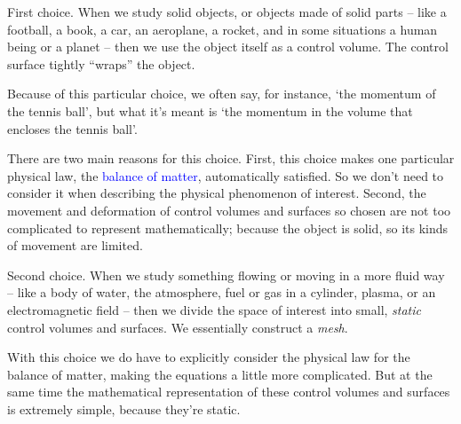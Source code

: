 \documentclass[a4paper,12pt,%
onecolumn,oneside,%
british%
]{memoir}
\renewcommand*{\|}[1][]{\nonscript\:#1\vert\nonscript\:\mathopen{}}
\newcommand*{\sect}{\S}%
\renewcommand*{\autoref}[2]{\sidepar{\vspace{-1ex}\footnotesize{\color{blue}\faIcon{%
angle-right%
}\enskip\sect~\ref{#1} page~\pageref{#1}}}\textcolor{blue}{#2}}
\begin{document}
\medskip

First choice. When we study solid objects, or objects made of solid parts -- like a football, a book, a car, an aeroplane, a rocket, and in some situations a human being or a planet -- then we use the object itself as a control volume. The control surface tightly \enquote{wraps} the object.

Because of this particular choice, we often say, for instance, \enquote*{the momentum of the tennis ball}, but what it's meant is \enquote*{the momentum in the volume that encloses the tennis ball}.

There are two main reasons for this choice. First, this choice makes one particular physical law, the \autoref{cha:cons_matter}{balance of matter}, automatically satisfied. So we don't need to consider it when describing the physical phenomenon of interest. Second, the movement and deformation of control volumes and surfaces so chosen are not too complicated to represent mathematically; because the object is solid, so its kinds of movement are limited.

\medskip

Second choice. When we study something flowing or moving in a more fluid way -- like a body of water, the atmosphere, fuel or gas in a cylinder, plasma, or an electromagnetic field -- then we divide the space of interest into small, \emph{static} control volumes and surfaces. We essentially construct a \emph{mesh}.

With this choice we do have to explicitly consider the physical law for the balance of matter, making the equations a little more complicated. But at the same time the mathematical representation of these control volumes and surfaces is extremely simple, because they're static.

\medskip
\end{document}
